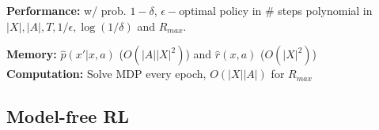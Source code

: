 \textbf{Performance:} w/ prob. $1-\delta$, $\epsilon-$optimal policy in \# steps polynomial in $|X|,|A|, T, 1/\epsilon, \log(1/\delta)$ and $R_{max}$.\\
\begin{comment}
	We do have a guarantee that after a certain amount of steps the algo makes progression, e.g. visits an unknown state-action pair or obtains near optimal rewards.\\
	\textbf{Demo:} The testing value is showing the results we would get by following the estimated policy.\\
	The Exploration value shows the results when we would act after the current policy (greedy, $\epsilon-$greedy,...)\\
	\textbf{Greedy Policy:} Oscilates between two states, because it detects that going in one direction eventually leads to bumping into a wall, and thus want's to go back immediatly.\\
	\textbf{Random:} Quickly saw all states and rewards, like a random walk. The Exploitation value of this policy is really bad, since we always place random actions. Actions and state that are far away may take long to be explored.\\
	\textbf{$\epsilon-$greedy:} Takes a little longer until all states are visited, but the exploitation value is much better, it concentrates much more on good states.\\
	\textbf{R$_{max}$:} Needs some iterations until it has enough samples, then decreases the estimated values accordingly.\\
\end{comment}

\textbf{Memory:} $\hat{p}(x' | x, a)$ ($O(|A||X|^2)$) and $\hat{r}(x, a)$ ($O(|X|^2)$) \\
\textbf{Computation:} Solve MDP every epoch, $O(|X||A|)$ for $R_{max}$\\
\begin{comment}
	After we get the estimations in, we compute the MDP (which is the end goal).\\
	The $R_{max}$ algorithm is guaranteed to make progress, but it can be that only one state-action pair is progressed per iteration.\\
\end{comment}


\subsection{Model-free RL}
\begin{comment}
	Want to approximate V directly from a policy\\
\end{comment}

